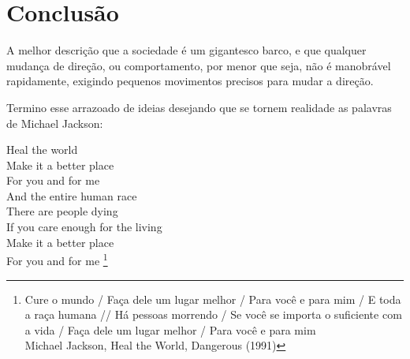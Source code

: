 \section{Conclusão}

A melhor descrição que a sociedade é um gigantesco barco, e que qualquer mudança de direção, ou comportamento, por menor que seja, não é manobrável rapidamente, exigindo pequenos movimentos precisos para mudar a direção.


Termino esse arrazoado de ideias desejando que se tornem realidade as palavras de Michael Jackson:

\begin{citacao}
    Heal the world\\
    Make it a better place\\
    For you and for me\\
    And the entire human race\\

    There are people dying\\
    If you care enough for the living\\
    Make it a better place\\
    For you and for me \footnote{
        Cure o mundo / Faça dele um lugar melhor / Para você e para mim / E toda a raça humana //
        Há pessoas morrendo / Se você se importa o suficiente com a vida / Faça dele um lugar melhor / Para você e para mim \\
        Michael Jackson, Heal the World, Dangerous (1991)
    }
\end{citacao}
